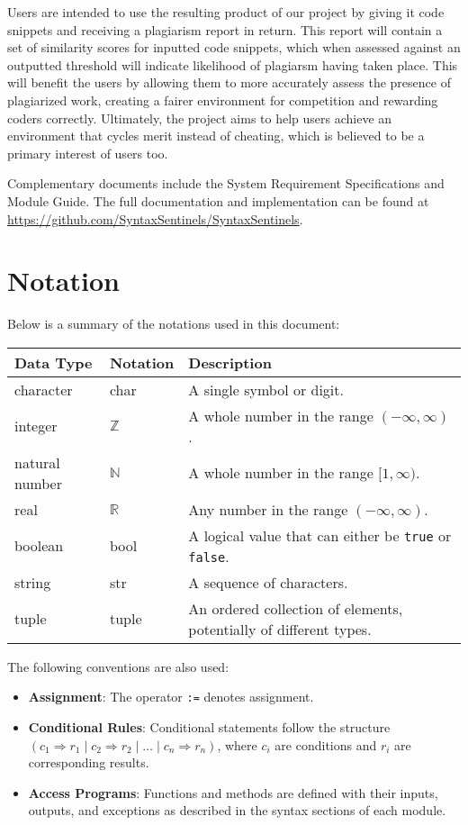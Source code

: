 \documentclass[12pt, titlepage]{article}
\begin{document}
Users are intended to use the resulting product of our project by giving
it code snippets and receiving a plagiarism report in return. This report
will contain a set of similarity scores for inputted code snippets, which when
assessed against an outputted threshold will indicate likelihood of plagiarsm
having taken place. This will benefit the users by allowing them to more accurately assess the presence of plagiarized work, 
creating a fairer environment for competition and rewarding coders correctly. 
Ultimately, the project aims to help users achieve an environment that cycles merit 
instead of cheating, which is believed to be a primary interest of users too.

Complementary documents include the System Requirement Specifications
and Module Guide.  The full documentation and implementation can be
found at \url{https://github.com/SyntaxSentinels/SyntaxSentinels}. 

\section{Notation}

Below is a summary of the notations used in this document:

\begin{center}
\renewcommand{\arraystretch}{1.2}
\noindent
\begin{tabular}{l l p{8cm}} 
\toprule 
\textbf{Data Type} & \textbf{Notation} & \textbf{Description} \\ 
\midrule
character & char & A single symbol or digit. \\ 
integer & $\mathbb{Z}$ & A whole number in the range $(-\infty, \infty)$. \\ 
natural number & $\mathbb{N}$ & A whole number in the range $[1, \infty)$. \\ 
real & $\mathbb{R}$ & Any number in the range $(-\infty, \infty)$. \\ 
boolean & bool & A logical value that can either be \texttt{true} or \texttt{false}. \\
string & str & A sequence of characters. \\ 
tuple & tuple & An ordered collection of elements, potentially of different types. \\ 
\bottomrule 
\end{tabular} 
\end{center}

\noindent
The following conventions are also used:
\begin{itemize}
    \item \textbf{Assignment}: The operator \texttt{:=} denotes assignment.
    \item \textbf{Conditional Rules}: Conditional statements follow the structure $(c_1 \Rightarrow r_1 \mid c_2 \Rightarrow r_2 \mid \ldots \mid c_n \Rightarrow r_n)$, where $c_i$ are conditions and $r_i$ are corresponding results.
    \item \textbf{Access Programs}: Functions and methods are defined with their inputs, outputs, and exceptions as described in the syntax sections of each module.
\end{itemize}
\end{document}
